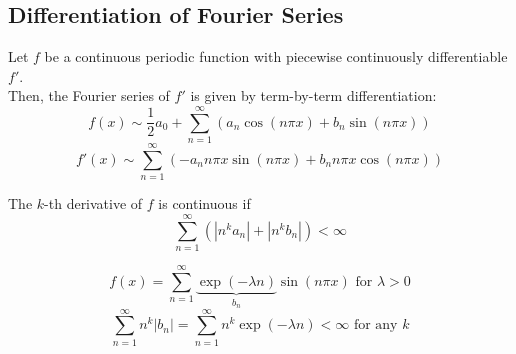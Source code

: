\subsection{Differentiation of Fourier Series}
\begin{theorem}
    Let $f$ be a continuous periodic function with piecewise continuously differentiable $f'$.
    \\Then, the Fourier series of $f'$ is given by term-by-term differentiation:
    \[f(x) \sim \frac{1}{2}a_0 + \sum_{n=1}^{\infty}(a_n \cos(n\pi x)+b_n \sin(n\pi x))\]
    \[f'(x) \sim \sum_{n=1}^{\infty} (-a_n n\pi x \sin(n\pi x)+ b_n n\pi x\cos (n\pi x))\]
\end{theorem}

\begin{theorem}
    The $k$-th derivative of $f$ is continuous if
    \[\sum_{n=1}^{\infty}(\left\lvert n^k a_n\right\rvert + \left\lvert n^k b_n \right\rvert ) < \infty\]
\end{theorem}

\begin{example}
    \[f(x) = \sum_{n=1}^{\infty} \underbrace{\exp (-\lambda n)}_{b_n} \sin (n\pi x) \text{ for } \lambda > 0\]
    \[\sum_{n=1}^{\infty}n^k \left\lvert b_n\right\rvert = \sum_{n=1}^{\infty}n^k \exp(-\lambda n) < \infty \text{ for any }k \]
\end{example}


